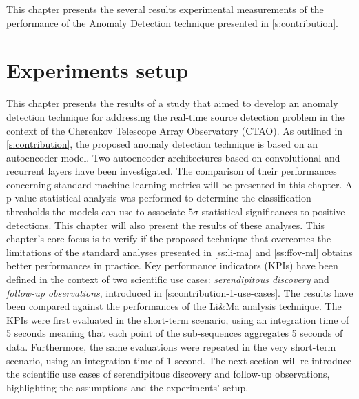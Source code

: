 \begin{chapabstract}
\small{
This chapter presents the several results experimental measurements of the performance of the Anomaly Detection technique presented in \autoref{s:contribution}.
}\\
\begin{center}
\noindent\makebox[0.8\linewidth]{\rule{0.66\paperwidth}{0.4pt}}
\end{center}
\vspace{1cm}
\end{chapabstract}

\section{Experiments setup}
\label{s:Experiment-Setup}
This chapter presents the results of a study that aimed to develop an anomaly detection technique for addressing the real-time source detection problem in the context of the Cherenkov Telescope Array Observatory (CTAO). As outlined in \autoref{s:contribution}, the proposed anomaly detection technique is based on an autoencoder model. Two autoencoder architectures based on convolutional and recurrent layers have been investigated. The comparison of their performances concerning standard machine learning metrics will be presented in this chapter. A p-value statistical analysis was performed to determine the classification thresholds the models can use to associate $5\sigma$ statistical significances to positive detections. This chapter will also present the results of these analyses. 
This chapter's core focus is to verify if the proposed technique that overcomes the limitations of the standard analyses presented in \autoref{ss:li-ma} and \autoref{ss:ffov-ml} obtains better performances in practice. Key performance indicators (KPIs) have been defined in the context of two scientific use cases: \textit{serendipitous discovery} and \textit{follow-up observations}, introduced in \autoref{s:contribution-1-use-cases}. The results have been compared against the performances of the Li\&Ma analysis technique. The KPIs were first evaluated in the short-term scenario, using an integration time of 5 seconds meaning that each point of the sub-sequences aggregates 5 seconds of data. Furthermore, the same evaluations were repeated in the very short-term scenario, using an integration time of 1 second. The next section will re-introduce the scientific use cases of serendipitous discovery and follow-up observations, highlighting the assumptions and the experiments' setup.

